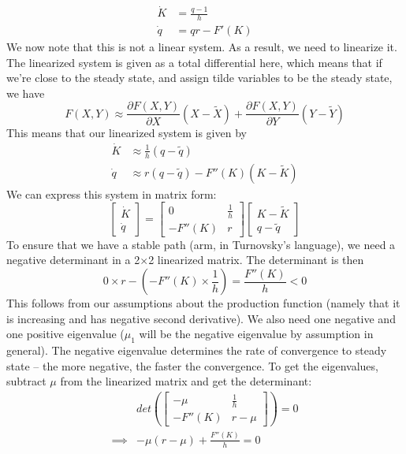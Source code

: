 \documentclass[12pt]{article}
\begin{document}
\begin{itemize}
\[\begin{split}
        \dot{K} &= \frac{q-1}{h} \\
        \dot{q} &= qr - F'(K)
    \end{split}\]
    We now note that this is not a linear system. As a result, we need to linearize it. The linearized system is given as a total differential here, which means that if we're close to the steady state, and assign tilde variables to be the steady state, we have
    \[F(X,Y) \approx \frac{\partial F(X,Y)}{\partial X}(X - \widetilde{X}) + \frac{\partial F(X,Y)}{\partial Y}(Y - \widetilde{Y})\]
    This means that our linearized system is given by
    \[\begin{split}
        \dot{K} &\approx \frac{1}{h}(q - \widetilde{q}) \\
        \dot{q} &\approx r(q-\widetilde{q}) - F''(K)(K - \widetilde{K})
    \end{split}\]
    We can express this system in matrix form:
    \[\begin{bmatrix}
    \dot{K} \\
    \dot{q}
    \end{bmatrix} = \begin{bmatrix}
    0 & \frac{1}{h} \\
    - F''(K) & r
    \end{bmatrix}\begin{bmatrix}
    K-\widetilde{K} \\
    q-\widetilde{q}
    \end{bmatrix}\]
    To ensure that we have a stable path (arm, in Turnovsky's language), we need a negative determinant in a 2$\times$2 linearized matrix. The determinant is then
    \[0 \times r - (-F''(K) \times \frac{1}{h}) = \frac{F''(K)}{h} < 0\]
    This follows from our assumptions about the production function (namely that it is increasing and has negative second derivative). We also need one negative and one positive eigenvalue ($\mu_1$ will be the negative eigenvalue by assumption in general). The negative eigenvalue determines the rate of convergence to steady state -- the more negative, the faster the convergence. To get the eigenvalues, subtract $\mu$ from the linearized matrix and get the determinant:
    \[\begin{split}
        &det\left(\begin{bmatrix}
        -\mu & \frac{1}{h} \\
         - F''(K) & r-\mu
        \end{bmatrix}\right) = 0\\
        \implies &-\mu(r-\mu) + \frac{F''(K)}{h} = 0 \\

\end{split}\]
\end{itemize}
\end{document}
